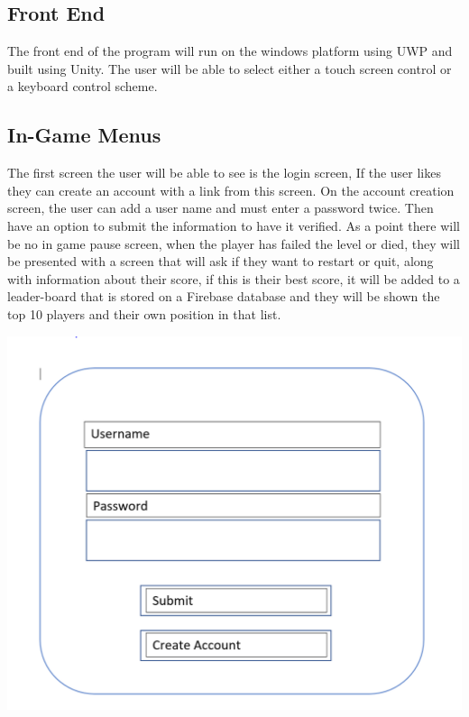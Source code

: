 \documentclass{article}
\begin{document}
\subsection{Front End}
The front end of the program will run on the windows platform using UWP and built using Unity. The user will be able to select either a touch screen control or a keyboard control scheme.
\subsection{In-Game Menus}
The first screen the user will be able to see is the login screen, If the user likes they can create an account with a link from this screen.
On the account creation screen, the user can add a user name and must enter a password twice. Then have an option to submit the information to have it verified. As a point there will be no in game pause screen, when the player has failed the level or died, they will be presented with a screen that will ask if they want to restart or quit, along with information about their score, if this is their best score, it will be added to a leader-board that is stored on a Firebase database and they will be shown the top 10 players and their own position in that list.
\begin{minipage}{0.5\textwidth}
\includegraphics[width=\linewidth]{loginscreen}
\end{minipage} \hfill
\end{document}
